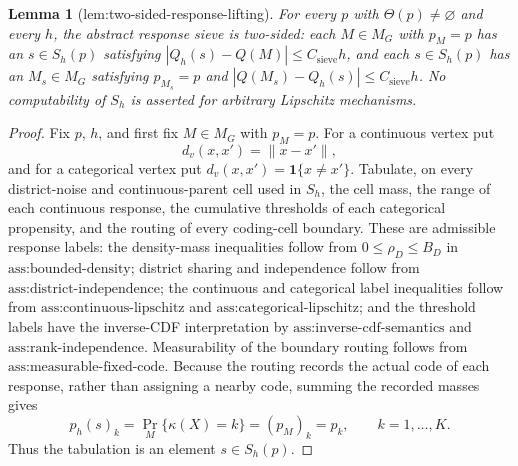 \documentclass{article}
\newtheorem{lemma}{Lemma}
\begin{document}
\begin{lemma}[lem:two-sided-response-lifting]\label{lem:two-sided-response-lifting}
For every \(p\) with \(\Theta(p)\ne\varnothing\) and every \(h\), the abstract response sieve is two-sided: each \(M\in M_G\) with \(p_M=p\) has an \(s\in S_h(p)\) satisfying \(|Q_h(s)-Q(M)|\le C_{\mathrm{sieve}}h\), and each \(s\in S_h(p)\) has an \(M_s\in M_G\) satisfying \(p_{M_s}=p\) and \(|Q(M_s)-Q_h(s)|\le C_{\mathrm{sieve}}h\). No computability of \(S_h\) is asserted for arbitrary Lipschitz mechanisms.
\end{lemma}
\begin{proof}
Fix \(p\), \(h\), and first fix \(M\in M_G\) with \(p_M=p\).  For a continuous vertex put
\[
d_v(x,x')=\lVert x-x'\rVert,
\]
and for a categorical vertex put \(d_v(x,x')=\mathbf 1\{x\ne x'\}\).  Tabulate, on every district-noise and continuous-parent cell used in \(S_h\), the cell mass, the range of each continuous response, the cumulative thresholds of each categorical propensity, and the routing of every coding-cell boundary.  These are admissible response labels: the density-mass inequalities follow from \(0\leq\rho_D\leq B_D\) in \(\text{ass:bounded-density}\); district sharing and independence follow from \(\text{ass:district-independence}\); the continuous and categorical label inequalities follow from \(\text{ass:continuous-lipschitz}\) and \(\text{ass:categorical-lipschitz}\); and the threshold labels have the inverse-CDF interpretation by \(\text{ass:inverse-cdf-semantics}\) and \(\text{ass:rank-independence}\).  Measurability of the boundary routing follows from \(\text{ass:measurable-fixed-code}\).  Because the routing records the actual code of each response, rather than assigning a nearby code, summing the recorded masses gives
\[
p_h(s)_k=\Pr_M\{\kappa(X)=k\}=(p_M)_k=p_k,
\qquad k=1,\ldots,K.                                            \tag{1}
\]
Thus the tabulation is an element \(s\in S_h(p)\).


\end{proof}
\end{document}
